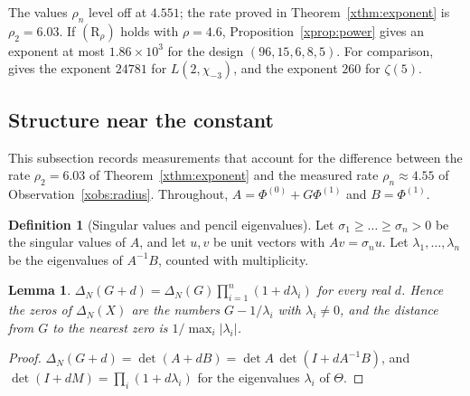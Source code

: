 \documentclass[11pt]{article}
\newtheorem{lemma}[theorem]{Lemma}
\theoremstyle{definition}
\newtheorem{definition}[theorem]{Definition}
\begin{document}
The values $\rho_n$ level off at $4.551$; the rate proved in Theorem~\ref{xthm:exponent} is $\rho_2=6.03$. If $(\mathrm R_\rho)$ holds with $\rho=4.6$, Proposition~\ref{xprop:power} gives an exponent at most $1.86\times10^3$ for the design $(96,15,6,8,5)$. For comparison, \cite[Theorem~5.1]{CDT} gives the exponent $24781$ for $L(2,\chi_{-3})$, and \cite[Corollary~1.2]{Fauzan} the exponent $260$ for $\zeta(5)$.

\subsection{Structure near the constant}\label{xsec:structure}

This subsection records measurements that account for the difference between the rate $\rho_2=6.03$ of Theorem~\ref{xthm:exponent} and the measured rate $\rho_n\approx4.55$ of Observation~\ref{xobs:radius}. Throughout, $A=\Phi^{(0)}+G\Phi^{(1)}$ and $B=\Phi^{(1)}$.

\begin{definition}[Singular values and pencil eigenvalues]\label{xdef:pencil}
Let $\sigma_1\ge\dots\ge\sigma_n>0$ be the singular values of $A$, and let $u,v$ be unit vectors with $Av=\sigma_nu$. Let $\lambda_1,\dots,\lambda_n$ be the eigenvalues of $A^{-1}B$, counted with multiplicity.
\end{definition}

\begin{lemma}\label{xlem:zeros}
$\Delta_N(G+d)=\Delta_N(G)\prod_{i=1}^n(1+d\lambda_i)$ for every real $d$. Hence the zeros of $\Delta_N(X)$ are the numbers $G-1/\lambda_i$ with $\lambda_i\ne0$, and the distance from $G$ to the nearest zero is $1/\max_i|\lambda_i|$.
\end{lemma}

\begin{proof}
$\Delta_N(G+d)=\det(A+dB)=\det A\,\det(I+dA^{-1}B)$, and $\det(I+dM)=\prod_i(1+d\lambda_i)$ for the eigenvalues $\lambda_i$ of $\Theta$.
\end{proof}
\end{document}
